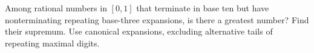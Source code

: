 Among rational numbers in $[0,1]$ that terminate in base ten but have nonterminating repeating base-three expansions, is there a greatest number? Find their supremum. Use canonical expansions, excluding alternative tails of repeating maximal digits.
